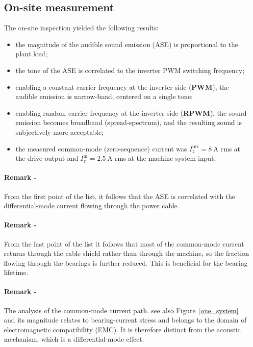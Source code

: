 \documentclass[11pt,a4paper,oneside]{book}
\begin{document}
\begin{onehalfspace}
\section{On-site measurement}
The on-site inspection yielded the following results:
\begin{itemize}
	\item[--] the magnitude of the audible sound emission (ASE) is proportional to
	the plant load;
	\item[--] the tone of the ASE is correlated to the inverter PWM switching frequency;
	\item[--] enabling a constant carrier frequency at the inverter side (\textbf{PWM}), the
	audible emission is narrow-band, centered on a single tone;
	\item[--] enabling random carrier frequency at the inverter side (\textbf{RPWM}), the sound emission becomes
	broadband (spread-spectrum), and the resulting sound is subjectively more acceptable;
	\item[--] the measured common-mode (zero-sequence) current was
	$I_z^{\mathrm{inv}}=\SI{8}{\ampere}$ rms at the drive output and
	$I_z^{\mathrm{m}}=\SI{2.5}{\ampere}$ rms at the machine system input; 
\end{itemize}

\paragraph{Remark -} From the first point of the list, it follows that the ASE is correlated with the differential-mode current flowing through the power cable.

\paragraph{Remark -} From the last point of the list it follows that most of the common-mode current returns through the cable shield rather than through the machine, so the fraction flowing through the bearings is further reduced. This is beneficial for the bearing lifetime.
	
\paragraph{Remark -} The analysis of the common-mode current path. see also Figure~\ref{one_system} and its magnitude relates to bearing-current stress and belongs to the domain of electromagnetic compatibility (EMC). It is therefore distinct from the acoustic mechanism, which is a differential-mode effect.


\end{onehalfspace}
\end{document}
